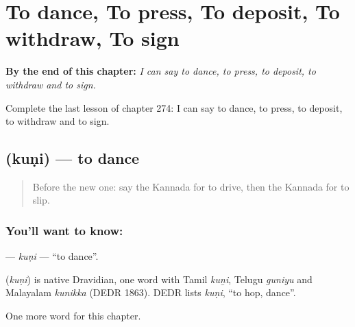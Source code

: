 
\chapter{To dance, To press, To deposit, To withdraw, To sign}
\label{ch:ka-to-dance-to-press-to-deposit-to-withdraw-to-sign}

\begin{chapteropening}
\textbf{By the end of this chapter:} \emph{I can say to dance, to press, to deposit, to withdraw and to sign.}

Complete the last lesson of chapter 274: I can say to dance, to press, to deposit, to withdraw and to sign.
\end{chapteropening}

\section[\texorpdfstring{\kn{ಕುಣಿ} (kuṇi)}{ಕುಣಿ (kuṇi)}]{ (kuṇi) — to dance}

\label{lesson:KA-C274-kuni}



\begin{quote}
Before the new one: say the Kannada for to drive, then the Kannada for to slip.
\end{quote}

\subsection*{You'll want to know: }
\textbf{} — \emph{kuṇi} — \textquotedblleft{}to dance\textquotedblright{}.

\begin{cousinweb}
\textbf{} (\emph{kuṇi}) is native Dravidian, one word with Tamil \emph{kuṉi}, Telugu \emph{guniyu} and Malayalam \emph{kunikka} (DEDR 1863). DEDR lists \emph{kuṇi}, \textquotedblleft{}to hop, dance\textquotedblright{}.
\end{cousinweb}

\begin{grammarlens}[title={What you've built}]
One more word for this chapter.
\end{grammarlens}

